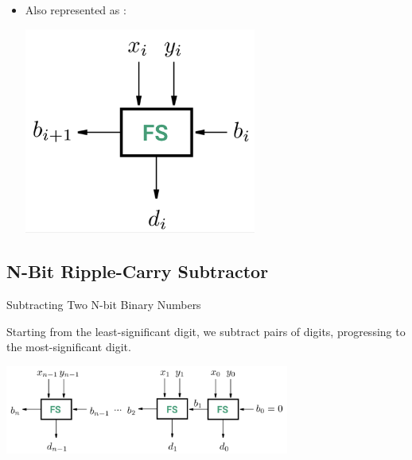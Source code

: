 \documentclass[12pt,openany, tikz,border=10pt]{book}
\begin{document}
\begin{itemize}
			      		\item[] Also represented as : 
			      		      \begin{center}
			      		      	\begin{minipage}[c]{0.60\textwidth} %
			      		      		\centering
			      		      		\includegraphics[width=0.60\textwidth]{circuits/8.2.4.png} %
			      		      	\end{minipage}
			      		      	  
			      		      \end{center}
			      	\end{itemize}
			      	
			      	\subsection{N-Bit Ripple-Carry Subtractor}
			      	Subtracting Two N-bit Binary Numbers
			      	
			      	Starting from the least-significant digit, we subtract pairs of digits, progressing to the most-significant digit.
			      	
			      	\begin{center}
			      		\begin{minipage}[c]{0.80\textwidth} %
			      			\centering
			      			\includegraphics[width=0.70\textwidth]{circuits/8.2.5.png} %
			      		\end{minipage}
			      		  
			      	\end{center}
			      	
\end{document}
